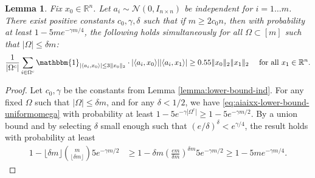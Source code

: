\documentclass[12pt]{article}
\newcommand{\1}{\mathbbm{1}}
\newcommand{\floor}[1]{\lfloor #1 \rfloor}
\newcommand{\xo}{x_0}
\newcommand{\R}{\mathbb{R}}
\newcommand{\Omegac}{\Omega^c}
\newcommand{\inddefwithnorm}{\mathbbm{1}_{|\langle a_i, \xo \rangle| \leq 3 \| \xo \|_2}}
\newcommand{\aixo}{\langle a_i, \xo \rangle}
\newcommand{\aixone}{\langle a_i, x_1 \rangle}
\newtheorem{lemma}[theorem]{Lemma}
\begin{document}
\begin{lemma}  \label{lemma:lower-bound-ind-uniformomega}
Fix $\xo \in \R^n$.  Let $a_i \sim \mathcal{N}(0, I_{n \times n})$ be independent for $i = 1 \ldots m$.  There exist positive constants $c_0, \gamma, \delta$ such that if $m \geq 2 c_0 n$, then with probability at least $1-5 m e^{-\gamma m/4}$, the following holds simultaneously for all $\Omega \subset [m]$ such that $|\Omega| \leq \delta m$:
\begin{align}
\frac{1}{|\Omegac|} \sum_{i\in\Omegac} \inddefwithnorm \cdot |\aixo | |\aixone | \geq 0.55 \| x_0\|_2 \|x_1\|_2 \quad \text{ for all } x_1 \in \R^n. \label{eq:aiaixx-lower-bound-uniformomega}
\end{align}
\end{lemma}
\begin{proof}
Let $c_0, \gamma$ be the constants from Lemma \ref{lemma:lower-bound-ind}.   For any fixed $\Omega$ such that $|\Omega| \leq \delta m$, and for any $\delta < 1/2$, we have \eqref{eq:aiaixx-lower-bound-uniformomega} with probability at least $1 - 5 e^{-\gamma |\Omegac|} \geq 1 - 5 e^{-\gamma m / 2}$.  By a union bound and by selecting $\delta$ small enough such that $(e/\delta)^\delta < e^{\gamma/4}$, the result holds with probability at least
\begin{align*}
1 - \floor{\delta m} {m \choose \floor{\delta m}}  5 e^{-\gamma m/2} & \geq  1 - \delta m \left( \frac{e m}{\delta m} \right ) ^{\delta m} 5  e^{-\gamma m/2} \geq 1 - 5 m e^{-\gamma m/4}.
\end{align*}
\end{proof}
\end{document}
